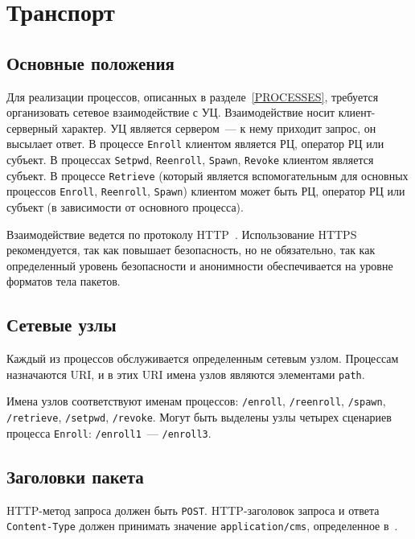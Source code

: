 \chapter{Транспорт}\label{TRANSPORT}

\section{Основные положения}\label{TRANSPORT.Common}

Для реализации процессов, описанных в разделе~\ref{PROCESSES}, требуется
организовать сетевое взаимодействие с УЦ. Взаимодействие носит
клиент-серверный характер. УЦ является сервером~--- к нему приходит запрос,
он высылает ответ. В процессе  \texttt{Enroll} клиентом является РЦ,
оператор РЦ или субъект. В процессах \texttt{Setpwd}, \texttt{Reenroll},
\texttt{Spawn}, \texttt{Revoke} клиентом является субъект. В процессе
\texttt{Retrieve} (который является вспомогательным для основных процессов
\texttt{Enroll}, \texttt{Reenroll}, \texttt{Spawn}) клиентом может быть РЦ,
оператор РЦ или субъект (в зависимости от основного процесса).

Взаимодействие ведется по протоколу HTTP~\cite{HTTP}.
Использование HTTPS рекомендуется, так как повышает безопасность,
но не обязательно, так как определенный уровень безопасности и анонимности
обеспечивается на уровне форматов тела пакетов.

\section{Сетевые узлы}\label{TRANSPORT.Endpoints}

Каждый из процессов обслуживается определенным сетевым узлом.
Процессам назначаются URI, и в этих URI имена узлов являются
элементами \texttt{path}.

Имена узлов соответствуют именам процессов: 
\texttt{/enroll},
\texttt{/reenroll},
\texttt{/spawn},
\texttt{/retrieve},
\texttt{/setpwd},
\texttt{/revoke}.
%
Могут быть выделены узлы четырех сценариев процесса \texttt{Enroll}:
\texttt{/enroll1}~--- \texttt{/enroll3}.

\section{Заголовки пакета}\label{TRANSPORT.Headers}

HTTP-метод запроса должен быть \texttt{POST}.
HTTP-заголовок запроса и ответа \texttt{Content-Type} должен принимать
значение \texttt{application/cms}, определенное в~\cite{ContentTypeCms}. 

